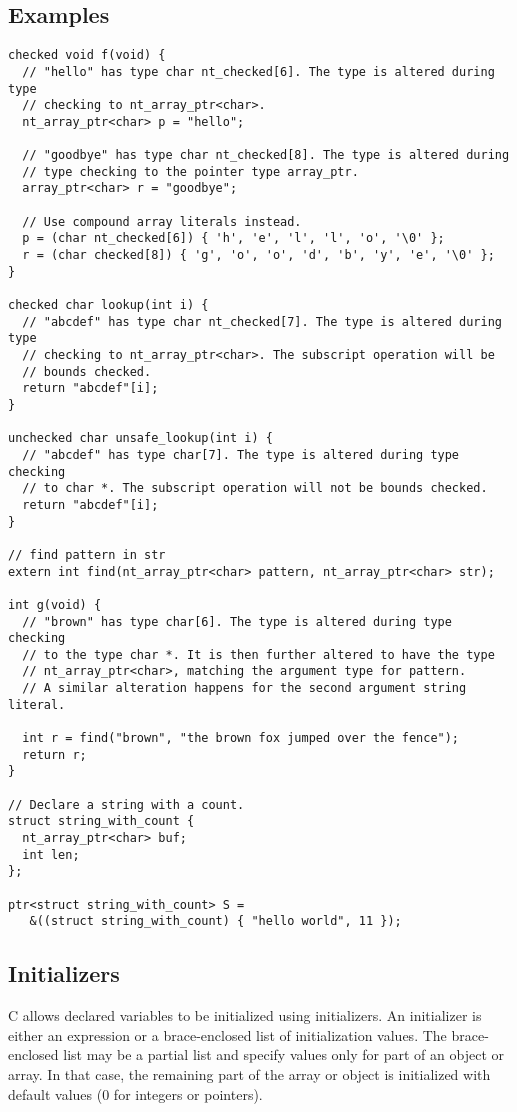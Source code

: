 \subsection{Examples}
\begin{lstlisting}
checked void f(void) {
  // "hello" has type char nt_checked[6]. The type is altered during type
  // checking to nt_array_ptr<char>.
  nt_array_ptr<char> p = "hello";

  // "goodbye" has type char nt_checked[8]. The type is altered during
  // type checking to the pointer type array_ptr.
  array_ptr<char> r = "goodbye";

  // Use compound array literals instead.
  p = (char nt_checked[6]) { 'h', 'e', 'l', 'l', 'o', '\0' };
  r = (char checked[8]) { 'g', 'o', 'o', 'd', 'b', 'y', 'e', '\0' };
}

checked char lookup(int i) {
  // "abcdef" has type char nt_checked[7]. The type is altered during type
  // checking to nt_array_ptr<char>. The subscript operation will be
  // bounds checked.
  return "abcdef"[i];
}

unchecked char unsafe_lookup(int i) {
  // "abcdef" has type char[7]. The type is altered during type checking
  // to char *. The subscript operation will not be bounds checked.
  return "abcdef"[i];
}

// find pattern in str
extern int find(nt_array_ptr<char> pattern, nt_array_ptr<char> str);

int g(void) {
  // "brown" has type char[6]. The type is altered during type checking
  // to the type char *. It is then further altered to have the type
  // nt_array_ptr<char>, matching the argument type for pattern.
  // A similar alteration happens for the second argument string literal.

  int r = find("brown", "the brown fox jumped over the fence");
  return r;
}

// Declare a string with a count.
struct string_with_count {
  nt_array_ptr<char> buf;
  int len;
};

ptr<struct string_with_count> S =
   &((struct string_with_count) { "hello world", 11 });
\end{lstlisting}

\subsection{Initializers}
C allows declared variables to be initialized using initializers.  An initializer
is either an expression or a brace-enclosed list of initialization values.
The brace-enclosed list may be a partial list and specify values only for
part of an object or array.  In that case, the remaining part of the
array or object is initialized with default values (0 for integers or
pointers).


